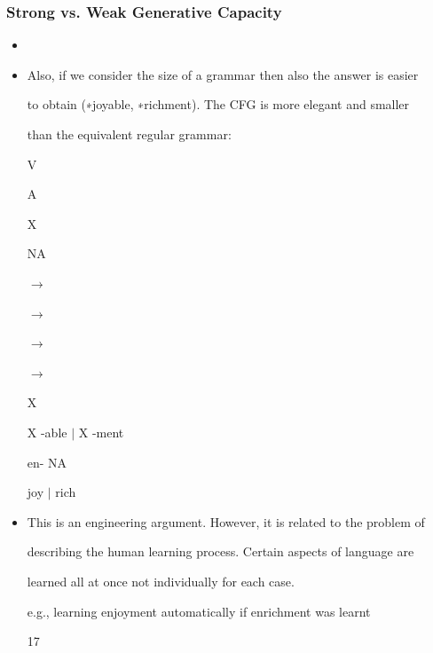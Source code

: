 \documentclass[compress,color=usenames]{beamer}
\begin{document}
\begin{frame}
\frametitle{Strong vs. Weak Generative Capacity}

\begin{itemize}
\item




\item Also, if we consider the size of a grammar then also the answer is easier


to obtain (∗joyable, ∗richment). The CFG is more elegant and smaller


than the equivalent regular grammar:





V


A


X


NA





$\rightarrow$


$\rightarrow$


$\rightarrow$


$\rightarrow$





X


X -able $\mid$ X -ment


en- NA


joy $\mid$ rich





\item This is an engineering argument. However, it is related to the problem of


describing the human learning process. Certain aspects of language are


learned all at once not individually for each case.


e.g., learning enjoyment automatically if enrichment was learnt


17




\end{itemize}

\end{frame}
\end{document}
